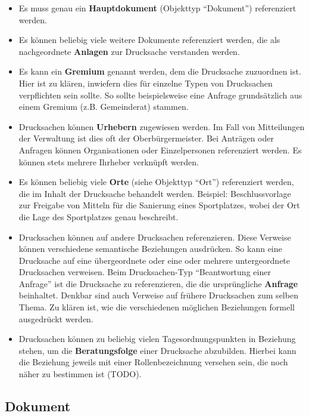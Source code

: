 \documentclass[,a4paper]{article}
\begin{document}
\begin{itemize}
\item
  Es muss genau ein \textbf{Hauptdokument} (Objekttyp ``Dokument'')
  referenziert werden.
\item
  Es können beliebig viele weitere Dokumente referenziert werden, die
  als nachgeordnete \textbf{Anlagen} zur Drucksache verstanden werden.
\item
  Es kann ein \textbf{Gremium} genannt werden, dem die Drucksache
  zuzuordnen ist. Hier ist zu klären, inwiefern dies für einzelne Typen
  von Drucksachen verpflichten sein sollte. So sollte beispielsweise
  eine Anfrage grundsätzlich aus einem Gremium (z.B. Gemeinderat)
  stammen.
\item
  Drucksachen können \textbf{Urhebern} zugewiesen werden. Im Fall von
  Mitteilungen der Verwaltung ist dies oft der Oberbürgermeister. Bei
  Anträgen oder Anfragen können Organisationen oder Einzelpersonen
  referenziert werden. Es können stets mehrere Ihrheber verknüpft
  werden.
\item
  Es können beliebig viele \textbf{Orte} (siehe Objekttyp ``Ort'')
  referenziert werden, die im Inhalt der Drucksache behandelt werden.
  Beispiel: Beschlussvorlage zur Freigabe von Mitteln für die Sanierung
  eines Sportplatzes, wobei der Ort die Lage des Sportplatzes genau
  beschreibt.
\item
  Drucksachen können auf andere Drucksachen referenzieren. Diese
  Verweise können verschiedene semantische Beziehungen ausdrücken. So
  kann eine Drucksache auf eine übergeordnete oder eine oder mehrere
  untergeordnete Drucksachen verweisen. Beim Drucksachen-Typ
  ``Beantwortung einer Anfrage'' ist die Drucksache zu referenzieren,
  die die ursprüngliche \textbf{Anfrage} beinhaltet. Denkbar sind auch
  Verweise auf frühere Drucksachen zum selben Thema. Zu klären ist, wie
  die verschiedenen möglichen Beziehungen formell ausgedrückt werden.
\item
  Drucksachen können zu beliebig vielen Tagesordnungspunkten in
  Beziehung stehen, um die \textbf{Beratungsfolge} einer Drucksache
  abzubilden. Hierbei kann die Beziehung jeweils mit einer
  Rollenbezeichnung versehen sein, die noch näher zu bestimmen ist
  (TODO).
\end{itemize}

\subsection{Dokument}
\end{document}
